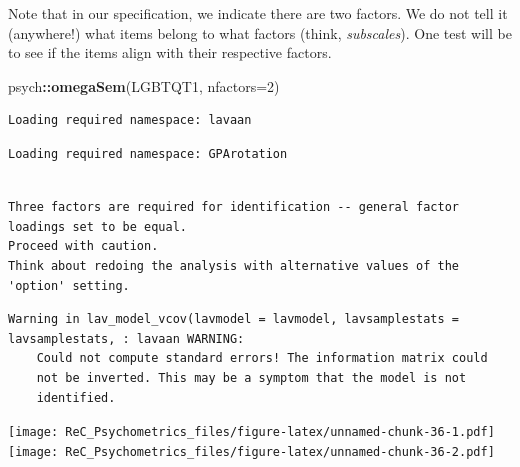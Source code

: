 \documentclass[
  english,
]{book}
\newenvironment{Shaded}{\begin{snugshade}}{\end{snugshade}}
\newcommand{\DataTypeTok}[1]{\textcolor[rgb]{0.13,0.29,0.53}{#1}}
\newcommand{\DecValTok}[1]{\textcolor[rgb]{0.00,0.00,0.81}{#1}}
\newcommand{\KeywordTok}[1]{\textcolor[rgb]{0.13,0.29,0.53}{\textbf{#1}}}
\newcommand{\NormalTok}[1]{#1}
\newcommand{\OperatorTok}[1]{\textcolor[rgb]{0.81,0.36,0.00}{\textbf{#1}}}
\begin{document}
Note that in our specification, we indicate there are two factors. We do not tell it (anywhere!) what items belong to what factors (think, \emph{subscales}). One test will be to see if the items align with their respective factors.

\begin{Shaded}
\begin{Highlighting}[]
\NormalTok{psych}\OperatorTok{::}\KeywordTok{omegaSem}\NormalTok{(LGBTQT1, }\DataTypeTok{nfactors=}\DecValTok{2}\NormalTok{)}
\end{Highlighting}
\end{Shaded}

\begin{verbatim}
Loading required namespace: lavaan
\end{verbatim}

\begin{verbatim}
Loading required namespace: GPArotation
\end{verbatim}

\begin{verbatim}

Three factors are required for identification -- general factor loadings set to be equal. 
Proceed with caution. 
Think about redoing the analysis with alternative values of the 'option' setting.
\end{verbatim}

\begin{verbatim}
Warning in lav_model_vcov(lavmodel = lavmodel, lavsamplestats = lavsamplestats, : lavaan WARNING:
    Could not compute standard errors! The information matrix could
    not be inverted. This may be a symptom that the model is not
    identified.
\end{verbatim}

\texttt{[image: ReC\_Psychometrics\_files/figure-latex/unnamed-chunk-36-1.pdf]} \texttt{[image: ReC\_Psychometrics\_files/figure-latex/unnamed-chunk-36-2.pdf]}
\end{document}
